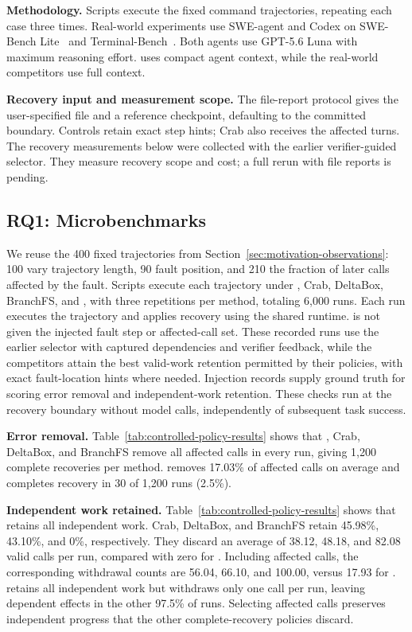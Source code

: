 \textbf{Methodology.}
Scripts execute the fixed command trajectories, repeating each case three
times. Real-world experiments use SWE-agent and Codex on
SWE-Bench Lite~\cite{swebench} and Terminal-Bench~\cite{tbench}.
Both agents use GPT-5.6 Luna with maximum reasoning effort. \system uses
compact agent context, while the real-world competitors use full context.

\textbf{Recovery input and measurement scope.}
The file-report protocol gives \system the user-specified file and a
reference checkpoint, defaulting to the committed boundary. Controls retain
exact step hints; Crab also receives the affected turns. The recovery
measurements below were collected with the earlier verifier-guided selector.
They measure recovery scope and cost; a full rerun with file reports is
pending.

\subsection{RQ1: Microbenchmarks}
\label{sec:eval-causal}

We reuse the 400 fixed trajectories from
Section~\ref{sec:motivation-observations}: 100 vary trajectory length, 90
fault position, and 210 the fraction of later calls affected by the fault.
Scripts execute each trajectory under \system, Crab, DeltaBox,
BranchFS, and \trycmd, with three repetitions per method, totaling
6,000 runs. Each run executes the trajectory and
applies recovery using the shared runtime. \system is not given the injected fault
step or affected-call set. These recorded runs use the earlier selector
with captured dependencies and verifier feedback, while the competitors attain the best
valid-work retention permitted by their policies, with exact fault-location
hints where needed.
Injection records supply ground truth for scoring error
removal and independent-work retention. These checks run at the recovery
boundary without model calls, independently of subsequent task success.



\textbf{Error removal.}
Table~\ref{tab:controlled-policy-results} shows that \system, Crab,
DeltaBox, and BranchFS remove all affected calls in every run, giving
1,200 complete recoveries per method. \trycmd removes 17.03\% of affected
calls on average and completes recovery in 30 of 1,200 runs (2.5\%).

\textbf{Independent work retained.}
Table~\ref{tab:controlled-policy-results} shows that \system retains all
independent work. Crab, DeltaBox, and BranchFS
retain 45.98\%, 43.10\%, and 0\%, respectively. They discard an average
of 38.12, 48.18, and 82.08 valid calls per run, compared with zero for
\system. Including affected calls, the corresponding withdrawal counts
are 56.04, 66.10, and 100.00, versus 17.93 for \system.
\trycmd retains all independent work but withdraws only one call per run,
leaving dependent effects in the other 97.5\% of runs.
Selecting affected calls preserves independent progress that the other
complete-recovery policies discard.


